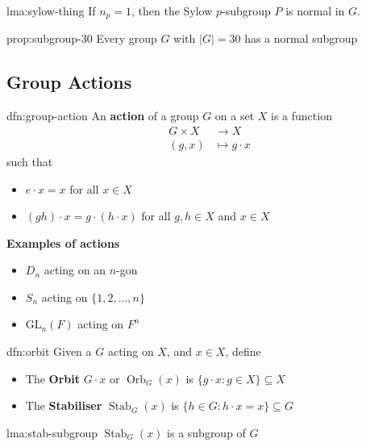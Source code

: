 \documentclass{article}
\DeclareMathOperator{\Orb}{Orb}
\DeclareMathOperator{\Stab}{Stab}
\begin{document}
\begin{lma}[]{lma:sylow-thing}{}
    If $n_{p} = 1$, then the Sylow $p$-subgroup $P$ is normal in $G$.
\end{lma}

\begin{ppn}[]{prop:subgroup-30}{}
    Every group $G$ with $\lvert G \rvert = 30$ has a normal subgroup
\end{ppn}

\subsection{Group Actions}

\begin{dfn}{dfn:group-action}{}
    An \textbf{action} of a group $G$ on a set $X$ is a function
    \begin{align*}
        G \times X &\to X\\
        (g,x) &\mapsto g \cdot x
    \end{align*}
    such that
    \begin{itemize}
        \item $e \cdot x = x$ for all $x\in X$
        \item $(gh) \cdot x = g \cdot (h \cdot x)$ for all $g,h\in X$ and $x\in X$
    \end{itemize}
\end{dfn}

\textbf{Examples of actions}
\begin{itemize}
    \item $D_{n}$ acting on an $n$-gon
    \item $S_{n}$ acting on $\{1,2,\dots,n\}$
    \item $\mathrm{GL}_{n}(F)$ acting on $F^{n}$
\end{itemize}

\begin{dfn}[Orbits]{dfn:orbit}{}
    Given a $G$ acting on $X$, and $x\in X$, define
    \begin{itemize}
        \item The \textbf{Orbit} $G \cdot x$ or $\Orb_{G}(x)$ is $\{g \cdot x : g\in X\} \subseteq X$
        \item The \textbf{Stabiliser} $\Stab_{G}(x)$ is $\{h\in G : h \cdot x = x\} \subseteq G$
    \end{itemize}
\end{dfn}

\begin{lma}[]{lma:stab-subgroup}{}
    $\Stab_{G}(x)$ is a subgroup of $G$
\end{lma}
\end{document}
